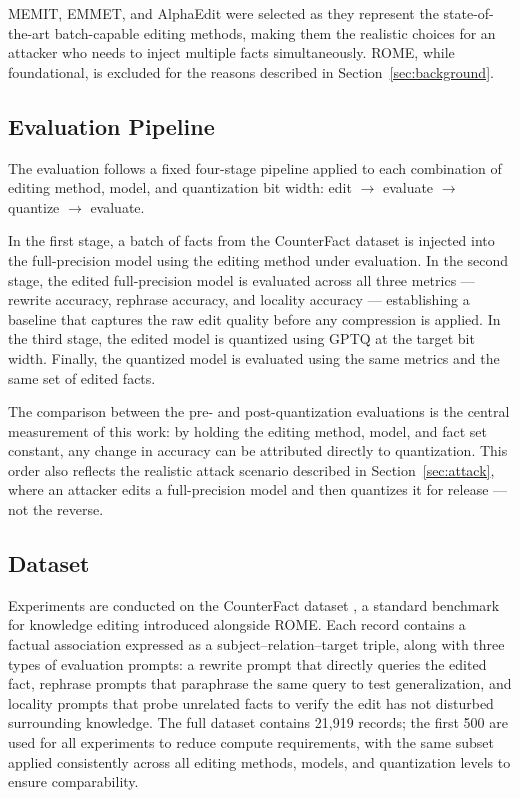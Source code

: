 \documentclass[conference]{IEEEtran}
\begin{document}
MEMIT, EMMET, and AlphaEdit were selected as they represent the state-of-the-art batch-capable editing methods, making them the realistic choices for an attacker who needs to inject multiple facts simultaneously. ROME, while foundational, is excluded for the reasons described in Section~\ref{sec:background}.

\subsection{Evaluation Pipeline}

The evaluation follows a fixed four-stage pipeline applied to each combination of editing method, model, and quantization bit width: edit $\rightarrow$ evaluate $\rightarrow$ quantize $\rightarrow$ evaluate.

In the first stage, a batch of facts from the CounterFact dataset is injected into the full-precision model using the editing method under evaluation. In the second stage, the edited full-precision model is evaluated across all three metrics --- rewrite accuracy, rephrase accuracy, and locality accuracy --- establishing a baseline that captures the raw edit quality before any compression is applied. In the third stage, the edited model is quantized using GPTQ at the target bit width. Finally, the quantized model is evaluated using the same metrics and the same set of edited facts.

The comparison between the pre- and post-quantization evaluations is the central measurement of this work: by holding the editing method, model, and fact set constant, any change in accuracy can be attributed directly to quantization. This order also reflects the realistic attack scenario described in Section~\ref{sec:attack}, where an attacker edits a full-precision model and then quantizes it for release --- not the reverse.

\subsection{Dataset}

Experiments are conducted on the CounterFact dataset \cite{b1}, a standard benchmark for knowledge editing introduced alongside ROME. Each record contains a factual association expressed as a subject--relation--target triple, along with three types of evaluation prompts: a rewrite prompt that directly queries the edited fact, rephrase prompts that paraphrase the same query to test generalization, and locality prompts that probe unrelated facts to verify the edit has not disturbed surrounding knowledge. The full dataset contains 21,919 records; the first 500 are used for all experiments to reduce compute requirements, with the same subset applied consistently across all editing methods, models, and quantization levels to ensure comparability.
\end{document}
